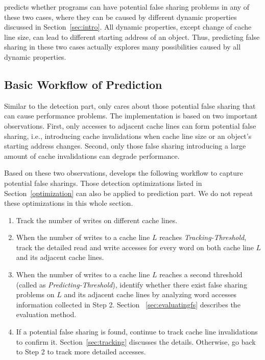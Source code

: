 \Predator{} predicts whether programs can have potential false sharing problems  
in any of these two cases, where they can be caused by different dynamic properties 
discussed in Section~\ref{sec:intro}.
All dynamic properties, except change of cache line size,
can lead to different starting address of an object. 
Thus, predicting false sharing in these two cases actually 
explores many possibilities caused by all dynamic properties.

\subsection{Basic Workflow of Prediction}
\label{sec:predictionmechanism} 

Similar to the detection part, 
\Predator{} only cares about those potential false sharing that can 
cause performance problems.
The implementation is based on
two important observations. First, only accesses to 
adjacent cache lines can form potential false sharing, 
i.e., introducing cache invalidations when cache line size
or an object's starting address changes.
Second, only those false sharing introducing a large amount of cache invalidations
can degrade performance.

Based on these two observations, \Predator{} develops 
the following workflow to capture potential false sharings.
Those detection optimizations listed in Section~\ref{optimization} can also be applied
to prediction part. We do not repeat these optimizations in
this whole section.

\begin{enumerate}
\item
Track the number of writes on different cache lines. 

\item
When the number of writes to a cache line $L$ reaches {\it Tracking-Threshold},
track the detailed read and write accesses for every word on both cache line $L$ 
and its adjacent cache lines. 

\item
When the number of writes to a cache line $L$ reaches a second threshold (called as
{\it Predicting-Threshold}), 
identify whether there exist false sharing problems on $L$ and its adjacent 
cache lines by analyzing word accesses information collected in Step 2. 
Section ~\ref{sec:evaluatingfs} describes the evaluation method.

\item
If a potential false sharing is found, continue to track cache line invalidations
to confirm it. Section~\ref{sec:tracking} discusses the details.
Otherwise, go back to Step 2 to track more detailed accesses.
 
\end{enumerate}

